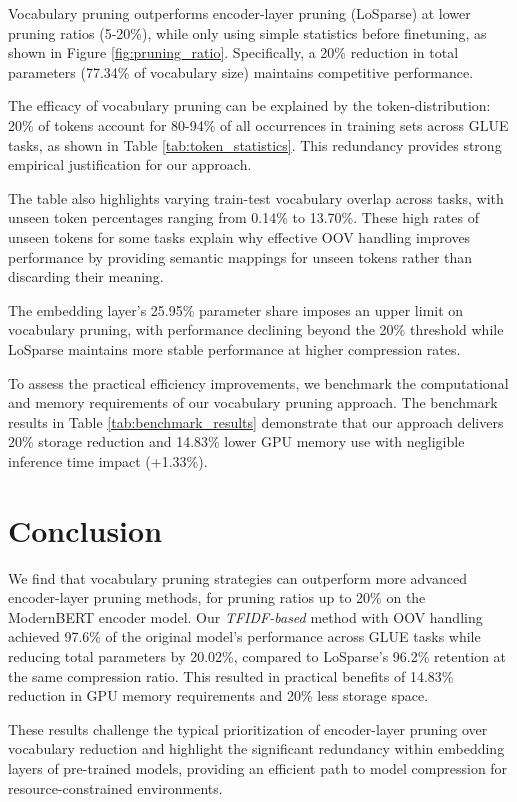 \documentclass[twocolumn]{article}
\begin{document}
Vocabulary pruning outperforms encoder-layer pruning (LoSparse) at lower pruning ratios (5-20\%), while only using simple statistics before finetuning, as shown in Figure \ref{fig:pruning_ratio}.
Specifically, a 20\% reduction in total parameters (77.34\% of vocabulary size) maintains competitive performance.


The efficacy of vocabulary pruning can be explained by the token-distribution: 20\% of tokens account for 80-94\% of all occurrences in training sets across GLUE tasks, as shown in Table \ref{tab:token_statistics}. This redundancy provides strong empirical justification for our approach. 

The table also highlights varying train-test vocabulary overlap across tasks, with unseen token percentages ranging from 0.14\% to 13.70\%. These high rates of unseen tokens for some tasks explain why effective OOV handling improves performance by providing semantic mappings for unseen tokens rather than discarding their meaning.


The embedding layer's 25.95\% parameter share imposes an upper limit on vocabulary pruning, with performance declining beyond the 20\% threshold while LoSparse maintains more stable performance at higher compression rates. 

To assess the practical efficiency improvements, we benchmark the computational and memory requirements of our vocabulary pruning approach. The benchmark results in Table \ref{tab:benchmark_results} demonstrate that our approach delivers 20\% storage reduction and 14.83\% lower GPU memory use with negligible inference time impact (+1.33\%).



\section{Conclusion}
We find that vocabulary pruning strategies can outperform more advanced encoder-layer pruning methods, for pruning ratios up to 20\% on the ModernBERT encoder model.
Our \textit{TFIDF-based} method with OOV handling achieved 97.6\% of the original model's performance across GLUE tasks while reducing total parameters by 20.02\%, compared to LoSparse's 96.2\% retention at the same compression ratio. This resulted in practical benefits of 14.83\% reduction in GPU memory requirements and 20\% less storage space.

These results challenge the typical prioritization of encoder-layer pruning over vocabulary reduction and highlight the significant redundancy within embedding layers of pre-trained models, providing an efficient path to model compression for resource-constrained environments.
\end{document}

